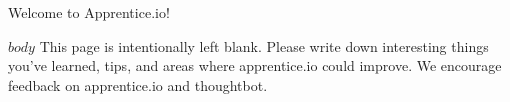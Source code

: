 \documentclass{book}
\begin{document}


  \vspace*{\fill}
    \begin{center}
      {\Huge Welcome to Apprentice.io!}
    \end{center}
  \vspace*{\fill}

  \clearpage

  \setcounter{page}{0}


  $body$
  \clearpage
  This page is intentionally left blank. Please write down interesting things
  you've learned, tips, and areas where apprentice.io could improve. We encourage
  feedback on apprentice.io and thoughtbot.
\end{document}
